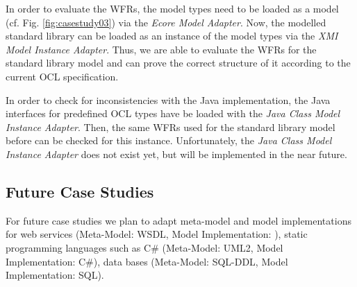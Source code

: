 In order to evaluate the WFRs, the model types need to be loaded as a model (cf. Fig. 
\ref{fig:casestudy03})  via the \textit{Ecore Model Adapter}. Now, the modelled standard library 
can be loaded as an instance of the model types via the \textit{XMI Model Instance Adapter}. Thus, 
we are able to evaluate the WFRs for the standard library model and can prove the correct 
structure of it according to the current OCL specification. 

In order to check for inconsistencies with the Java implementation, the Java interfaces 
for predefined OCL types have  be loaded with the \textit{Java Class Model Instance Adapter}. Then, the same WFRs 
used for the standard library model before can be checked for this instance. 
Unfortunately, the \textit{Java Class Model Instance Adapter} does not exist yet, but will be 
implemented in the near future.


\subsection{Future Case Studies}

For future case studies we plan to adapt meta-model and model implementations for web services (Meta-Model: WSDL, Model Implementation: ), static programming languages such as C\# (Meta-Model: UML2, Model Implementation: C\#), data bases (Meta-Model: SQL-DDL, Model Implementation: SQL). 

